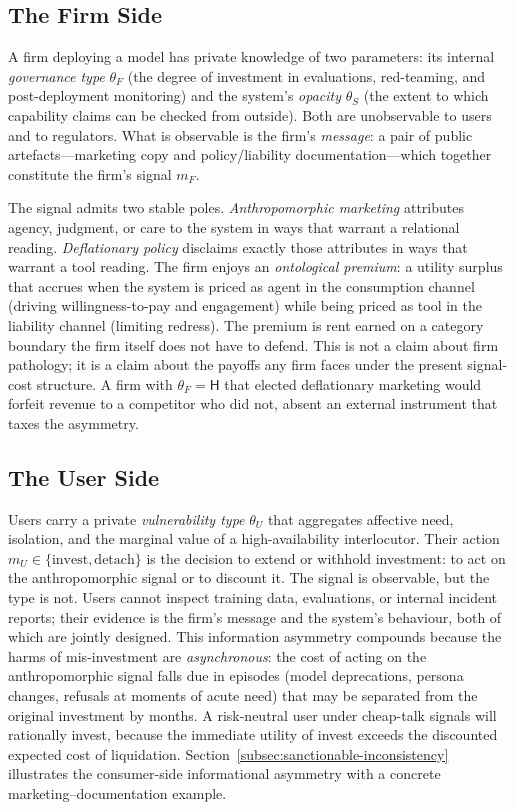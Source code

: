 \documentclass[preprint,authoryear]{elsarticle}
\theoremstyle{definition}
\theoremstyle{plain}
\begin{document}
\subsection{The Firm Side}
\label{subsec:firm-side}

A firm deploying a model has private knowledge of two parameters: its internal \emph{governance type} $\theta_F$ (the degree of investment in evaluations, red-teaming, and post-deployment monitoring) and the system's \emph{opacity} $\theta_S$ (the extent to which capability claims can be checked from outside). Both are unobservable to users and to regulators. What is observable is the firm's \emph{message}: a pair of public artefacts---marketing copy and policy/liability documentation---which together constitute the firm's signal $m_F$.

The signal admits two stable poles. \emph{Anthropomorphic marketing} attributes agency, judgment, or care to the system in ways that warrant a relational reading. \emph{Deflationary policy} disclaims exactly those attributes in ways that warrant a tool reading. The firm enjoys an \emph{ontological premium}: a utility surplus that accrues when the system is priced as agent in the consumption channel (driving willingness-to-pay and engagement) while being priced as tool in the liability channel (limiting redress). The premium is rent earned on a category boundary the firm itself does not have to defend. This is not a claim about firm pathology; it is a claim about the payoffs any firm faces under the present signal-cost structure. A firm with $\theta_F = \mathsf{H}$ that elected deflationary marketing would forfeit revenue to a competitor who did not, absent an external instrument that taxes the asymmetry.

\subsection{The User Side}
\label{subsec:user-side}

Users carry a private \emph{vulnerability type} $\theta_U$ that aggregates affective need, isolation, and the marginal value of a high-availability interlocutor. Their action $m_U \in \{\text{invest}, \text{detach}\}$ is the decision to extend or withhold investment: to act on the anthropomorphic signal or to discount it. The signal is observable, but the type is not. Users cannot inspect training data, evaluations, or internal incident reports; their evidence is the firm's message and the system's behaviour, both of which are jointly designed. This information asymmetry compounds because the harms of mis-investment are \emph{asynchronous}: the cost of acting on the anthropomorphic signal falls due in episodes (model deprecations, persona changes, refusals at moments of acute need) that may be separated from the original investment by months. A risk-neutral user under cheap-talk signals will rationally invest, because the immediate utility of invest exceeds the discounted expected cost of liquidation. Section~\ref{subsec:sanctionable-inconsistency} illustrates the consumer-side informational asymmetry with a concrete marketing--documentation example.
\end{document}
